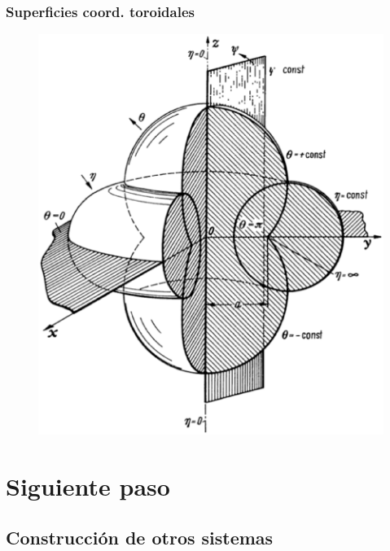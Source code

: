 \documentclass[12pt]{beamer}
\begin{document}
\begin{frame}
\frametitle{Superficies coord. toroidales}
\begin{figure}[H]
\centering
\includegraphics[scale=0.25]{Imagenes/Sistema_Toroidal.eps}
\end{figure}
\end{frame}

\section{Siguiente paso}
\subsection{Construcción de otros sistemas}
\end{document}
